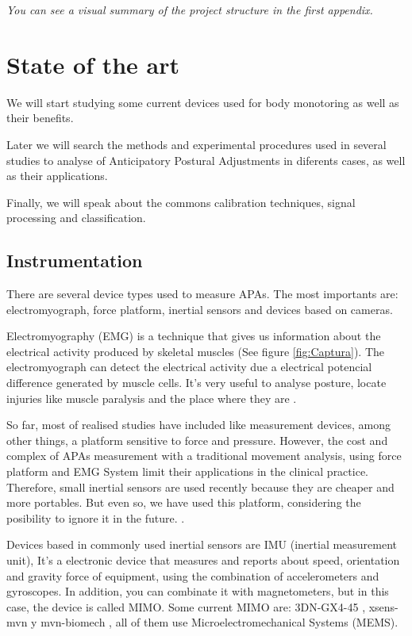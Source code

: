 \textit{You can see a visual summary of the project structure in the first appendix.}

\section{State of the art}

We will start studying some current devices used for body monotoring as well as their benefits.

Later we will search the methods and experimental procedures used in several studies to analyse of Anticipatory Postural Adjustments in diferents cases, as well as their applications.

Finally, we will speak about the commons calibration techniques, signal processing and classification.


\subsection{Instrumentation}

There are several  device types used to measure APAs. The most importants are: electromyograph, force platform, inertial sensors and devices based on cameras. 

Electromyography (EMG) is a technique that gives us information about the electrical activity produced by skeletal muscles (See figure \ref{fig:Captura}). The electromyograph can detect  the electrical activity due a electrical potencial difference generated by muscle cells. It’s very useful to analyse posture, locate injuries like muscle paralysis and the place where they are \cite{Marcio2010} \cite{Instr1}. 


So far, most of realised studies have included like measurement devices, among other things, a platform sensitive to force and pressure. However, the cost and complex of APAs measurement with a traditional movement analysis, using force platform and EMG System limit their applications in the  clinical practice. Therefore, small inertial sensors are used recently because they are cheaper and more portables. But even so, we have used this platform, considering the posibility to ignore it in the future. \cite{Mancini2009} \cite{Vennila2011}.

Devices based in commonly used inertial sensors are IMU (inertial measurement unit), It’s a electronic device that measures and reports about speed, orientation and gravity force of equipment, using the combination of accelerometers and gyroscopes.
In addition, you can combinate it with magnetometers, but in this case, the device is called MIMO. Some current MIMO are: 3DN-GX4-45 \cite{Instr2},  xsens-mvn \cite{Instr3} y mvn-biomech \cite{Instr4}, all of them use Microelectromechanical Systems (MEMS).

